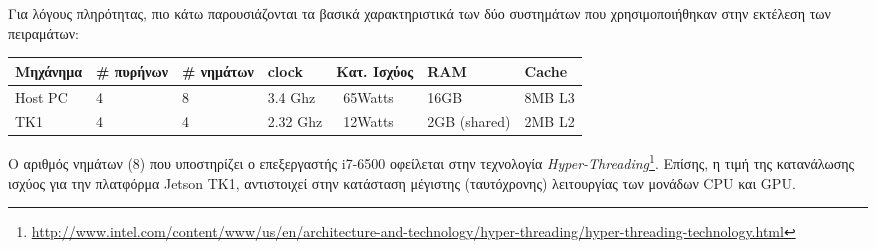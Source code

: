 

Για λόγους πληρότητας, πιο κάτω παρουσιάζονται τα βασικά χαρακτηριστικά
των δύο συστημάτων που χρησιμοποιήθηκαν στην εκτέλεση των πειραμάτων:
\begin{center}
\small
\begin{tabular}{ | l | l | l | l | l | l | l | }
  \hline
  \rowcolor{Gray}
  Μηχάνημα & \# πυρήνων & \# νημάτων & clock & Κατ. Ισχύος & RAM & Cache \\
  \hline
  Host PC & 4 & 8 & 3.4 Ghz & ~65Watts & 16GB & 8MΒ L3 \\
  \hline
  TK1 & 4 & 4 & 2.32 Ghz & ~12Watts & 2GB (shared) & 2MB L2 \\
  \hline
\end{tabular}
\end{center}

Ο αριθμός νημάτων (8) που υποστηρίζει ο επεξεργαστής i7-6500 οφείλεται στην
τεχνολογία \emph{Hyper-Threading}\footnote{\url{http://www.intel.com/content/www/us/en/architecture-and-technology/hyper-threading/hyper-threading-technology.html}}.
Επίσης, η τιμή της κατανάλωσης ισχύος για την
πλατφόρμα Jetson TK1, αντιστοιχεί στην κατάσταση μέγιστης (ταυτόχρονης) λειτουργίας των μονάδων
CPU και GPU.




\newpage

